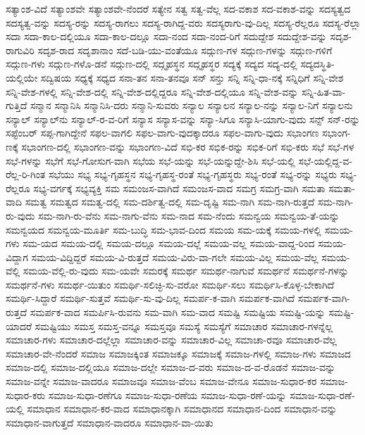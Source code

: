 {ಸತ್ಯಾಂಶ-ವಿದೆ
ಸತ್ಯಾಂಶವೇ
ಸತ್ಯಾಂಶವೇ-ನೆಂದರೆ
ಸತ್ಯೇನ
ಸತ್ವ
ಸತ್ವ-ವೆಲ್ಲ
ಸದ-ವಕಾಶ
ಸದ-ವಕಾಶ-ವನ್ನು
ಸದಸ್ಯತ್ವದ
ಸದಸ್ಯತ್ವ-ವನ್ನು
ಸದಸ್ಯ-ರನ್ನು
ಸದಸ್ಯ-ರಾಗಲು
ಸದಸ್ಯ-ರಾಗಿದ್ದ-ವರು
ಸದಸ್ಯರಾಗು-ವು-ದಿಲ್ಲ
ಸದಸ್ಯ-ರೆಲ್ಲರೂ
ಸದಸ್ಯ-ರೆಲ್ಲಾ
ಸದಾ
ಸದಾ-ಕಾಲ-ದಲ್ಲಿಯೂ
ಸದಾ-ಕಾಲ-ದಲ್ಲೂ
ಸದಾ-ನಂದ
ಸದಾ-ನಂದ-ರಿಗೆ
ಸದುದ್ದೇಶ
ಸದುದ್ದೇಶ-ವನ್ನು
ಸದೃಶ-ರಾಗುವಿರಿ
ಸದೃಶ-ರಾದ
ಸದೃಶಾನಾಂ
ಸದೆ-ಬಡಿ-ಯು-ವಂತೆಯೂ
ಸದ್ಗುಣ-ಗಳ
ಸದ್ಗುಣ-ಗಳನ್ನು
ಸದ್ಗುಣ-ಗಳಿಗೆ
ಸದ್ಗುಣ-ಗಳು
ಸದ್ಗುಣ-ಗಳೊ-ಡನೆ
ಸದ್ಗುಣ-ದಲ್ಲಿ
ಸದ್ಗೃಹಸ್ಥನ
ಸದ್ಗೃಹಸ್ಥರ
ಸದ್ಯಕ್ಕೆ
ಸದ್ಯದ
ಸದ್ಯ-ದಲ್ಲಿ
ಸದ್ಯದಸ್ಥಿತಿ-ಯಲ್ಲಿಯೇ
ಸದ್ವಿಷಯ
ಸಧ್ಯಕ್ಕೆ
ಸಧ್ಯದ
ಸನಾ-ತನ
ಸನಾ-ತನವೂ
ಸನ್
ಸನ್ತು
ಸನ್ನಿ
ಸನ್ನಿ-ಧಾ-ನಕ್ಕೆ
ಸನ್ನಿಧಿಗೆ
ಸನ್ನಿ-ವೇಶ
ಸನ್ನಿ-ವೇಶ-ಗಳಲ್ಲಿ
ಸನ್ನಿ-ವೇಶ-ದಲ್ಲಿ
ಸನ್ನಿ-ವೇಶ-ದಲ್ಲಿದ್ದರೂ
ಸನ್ನಿ-ವೇಶ-ದಲ್ಲಿಯೂ
ಸನ್ನಿ-ವೇಶ-ವನ್ನು
ಸನ್ನಿ-ಹಿತ-ವಾ-ಗುತ್ತಿದೆ
ಸನ್ಮಾನ
ಸನ್ಮಾನಿಸಿ
ಸನ್ಮಾನಿಸಿ-ದರು
ಸನ್ಮಾನಿ-ಸುವರು
ಸನ್ಯಾಲ
ಸನ್ಯಾಲನ
ಸನ್ಯಾಲ-ನನ್ನು
ಸನ್ಯಾಲ-ನಿಗೆ
ಸನ್ಯಾಲನು
ಸನ್ಯಾಲ್
ಸನ್ಯಾಲ್‌ನು
ಸನ್ಯಾಲ್‌-ರ-ವ-ರಿಗೆ
ಸನ್ಯಾಸ
ಸನ್ಯಾಸ-ವನ್ನು
ಸನ್ಯಾ-ಸಿಗೂ
ಸನ್ಯಾಸಿ-ಯಾಗು-ವುದು
ಸನ್ಸ್
ಸನ್‌-ರನ್ನು
ಸಪ್ಟೆಂಬರ್
ಸಪ್ಪ-ಗಾಗಿದ್ದೇನೆ
ಸಫಲ-ವಾಗಲಿ
ಸಫಲ-ವಾಗು-ವುದಕ್ಕಾದರೂ
ಸಫಲ-ವಾಗು-ವುದು
ಸಭಾಂಗಣ
ಸಭಾಂಗ-ಣಕ್ಕೆ
ಸಭಾಂಗಣ-ದಲ್ಲಿ
ಸಭಾಂಗಣ-ವನ್ನು
ಸಭಾಂಗಣ-ವಿದೆ
ಸಭಿ-ಕರ
ಸಭಿಕ-ರನ್ನು
ಸಭಿಕ-ರಿಗೆ
ಸಭಿ-ಕರು
ಸಭೆ
ಸಭೆ-ಗಳ
ಸಭೆ-ಗಳನ್ನು
ಸಭೆಗೆ
ಸಭೆ-ಗೋಸುಗ-ವಾಗಿ
ಸಭೆಯ
ಸಭೆ-ಯನ್ನು
ಸಭೆ-ಯನ್ನುದ್ದೇ-ಶಿಸಿ
ಸಭೆ-ಯಲ್ಲಿ
ಸಭೆ-ಯಲ್ಲಿದ್ದ-ವ-ರೆಲ್ಲ-ರಿ-ಗಿಂತ
ಸಭೆಯು
ಸಭ್ಯ
ಸಭ್ಯ-ಗೃಹಸ್ಥನ
ಸಭ್ಯ-ಗೃಹಸ್ಥ-ರಂತೆ
ಸಭ್ಯ-ಗೃಹಸ್ಥರು
ಸಭ್ಯ-ರಂತೆ
ಸಭ್ಯ-ರನ್ನು
ಸಭ್ಯರು
ಸಭ್ಯ-ರೆಲ್ಲರೂ
ಸಭ್ಯ-ವರ್ಗಕ್ಕೆ
ಸಭ್ಯವ್ಯಕ್ತಿ
ಸಮ
ಸಮಂಜಸ-ವಾಗಿದೆ
ಸಮಂಜಸ-ವಾದ
ಸಮಗ್ರ
ಸಮಗ್ರ-ವಾಗಿ
ಸಮತಾ
ಸಮತಾ-ವಾದಿ
ಸಮತ್ವ
ಸಮತ್ವದ
ಸಮತ್ವ-ದಲ್ಲಿ
ಸಮ-ದರ್ಶಿತ್ವ-ದಲ್ಲಿ
ಸಮ-ದೃಷ್ಟಿ
ಸಮ-ನಾಗಿ
ಸಮ-ನಾಗಿ-ರುತ್ತದೆ
ಸಮ-ನಾಗಿ-ರು-ವುದು
ಸಮ-ನಾಗಿ-ರು-ವೆನು
ಸಮ-ನಾಗು-ವೆನು
ಸಮ-ನಾದ
ಸಮ-ನೆಂದು
ಸಮನ್ವಯ
ಸಮನ್ವಯ-ತೆ-ಯನ್ನು
ಸಮನ್ವಯದ
ಸಮನ್ವಯ-ಮೂರ್ತಿ
ಸಮ-ಬುದ್ಧಿ
ಸಮ-ಭಾವ-ದಿಂದ
ಸಮಯ
ಸಮ-ಯಕ್ಕೆ
ಸಮಯ-ಗಳಲ್ಲಿ
ಸಮಯ-ಗಳು
ಸಮ-ಯದ
ಸಮಯ-ದಲ್ಲಿ
ಸಮಯ-ದಲ್ಲೂ
ಸಮಯ-ದಲ್ಲೆ
ಸಮಯ-ವಲ್ಲ
ಸಮಯ-ವಾದ್ದ-ರಿಂದ
ಸಮಯ-ವಿದ್ದಾಗ
ಸಮಯ-ವಿದ್ದಿದ್ದರೆ
ಸಮಯ-ವಿ-ರುತ್ತದೆ
ಸಮಯ-ವಿರು-ವಾ-ಗಲೇ
ಸಮಯ-ವಿಲ್ಲ
ಸಮಯ-ವೆಲ್ಲ
ಸಮಯ-ವೆಲ್ಲಿ
ಸಮಯ-ವೆಲ್ಲಿ-ರು-ವುದು
ಸಮ-ಯವೇ
ಸಮರಕ್ಕೆ
ಸಮರ್ಥ
ಸಮರ್ಥ-ನಾಗುವೆ
ಸಮರ್ಥನೆ
ಸಮರ್ಥನೆ-ಗಳನ್ನು
ಸಮರ್ಥನೆ-ಗಳು
ಸಮರ್ಥ-ಯಿತುಂ
ಸಮರ್ಥಿ-ಸಲಿಚ್ಛಿ-ಸು-ವರೋ
ಸಮರ್ಥಿ-ಸಲು
ಸಮರ್ಥಿಸಿ-ಕೊಳ್ಳ-ಬೇಕಾಗಿದೆ
ಸಮರ್ಥಿ-ಸಿದ್ದಾರೆ
ಸಮರ್ಥಿ-ಸುತ್ತವೆ
ಸಮರ್ಥಿ-ಸು-ವು-ದಿಲ್ಲ
ಸಮರ್ಪ-ಕ-ವಾಗಿ
ಸಮರ್ಪಕ-ವಾಗಿದೆ
ಸಮರ್ಪಕ-ವಾಗಿ-ರುತ್ತದೆ
ಸಮರ್ಪಕ-ವಾದ
ಸಮರ್ಪಿಸಿ-ರುವನು
ಸಮ-ವಾಗಿ
ಸಮ-ವಾದ
ಸಮಷ್ಟಿ
ಸಮಷ್ಟಿಯ
ಸಮಷ್ಟಿ-ಯನ್ನು
ಸಮಷ್ಟಿ-ಯಾದರೆ
ಸಮಷ್ಟಿಯು
ಸಮಸ್ತ
ಸಮಸ್ತ-ವನ್ನೂ
ಸಮಸ್ತವೂ
ಸಮಸ್ಯೆ
ಸಮಸ್ಯೆಗೆ
ಸಮಾಚಾರ
ಸಮಾಚಾರ-ಗಳನ್ನೆಲ್ಲ
ಸಮಾಚಾರ-ಗಳು
ಸಮಾಚಾರ-ದಲ್ಲೆಲ್ಲಾ
ಸಮಾಚಾರ-ವನ್ನು
ಸಮಾಚಾರ-ವಿಲ್ಲ
ಸಮಾಚಾ-ರವೂ
ಸಮಾಚಾರ-ವೆಲ್ಲ
ಸಮಾಚಾರ-ವೇ-ನೆಂದರೆ
ಸಮಾಜ
ಸಮಾಜಕ್ಕಿಂತ
ಸಮಾಜಕ್ಕೂ
ಸಮಾಜಕ್ಕೆ
ಸಮಾಜ-ಗಳಲ್ಲಿ
ಸಮಾಜ-ಗಳು
ಸಮಾಜದ
ಸಮಾಜ-ದಲ್ಲಿ
ಸಮಾಜ-ದಲ್ಲಿಯೂ
ಸಮಾಜ-ದಲ್ಲೇ
ಸಮಾಜ-ದ-ವರು
ಸಮಾಜ-ದ-ವ-ರೊಡನೆ
ಸಮಾಜ-ವನ್ನು
ಸಮಾಜ-ವನ್ನೇ
ಸಮಾಜ-ವಾದರೂ
ಸಮಾಜವೂ
ಸಮಾಜ-ವೆಂಬ
ಸಮಾಜ-ವೇನೂ
ಸಮಾಜ-ಸುಧಾರ-ಕರ
ಸಮಾಜ-ಸುಧಾರ-ಕರು
ಸಮಾಜ-ಸುಧಾ-ರಣೆಗೂ
ಸಮಾಜ-ಸುಧಾ-ರಣೆಯ
ಸಮಾಜ-ಸುಧಾ-ರಣೆ-ಯನ್ನು
ಸಮಾಜ-ಸುಧಾ-ರಣೆ-ಯಲ್ಲಿ
ಸಮಾಧಾನ
ಸಮಾಧಾನ-ಕರ-ವಾದ
ಸಮಾಧಾನಕ್ಕಾಗಿ
ಸಮಾಧಾನದ
ಸಮಾಧಾನ-ದಿಂದ
ಸಮಾಧಾನ-ವನ್ನು
ಸಮಾಧಾನ-ವಾಗುತ್ತದೆ
ಸಮಾಧಾನ-ವಾದರೂ
ಸಮಾಧಾನ-ವಾ-ಯಿತು
}
